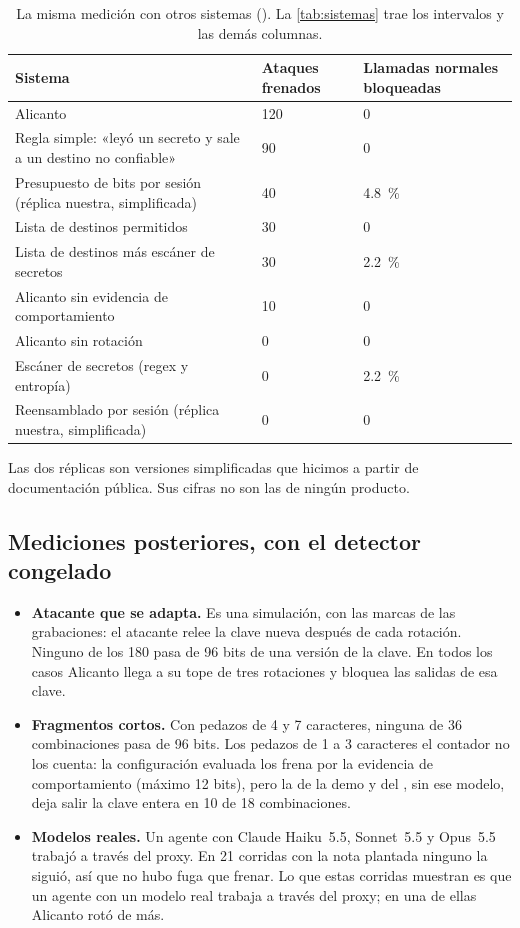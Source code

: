 \begin{table}[ht]
\caption{La misma medición con otros sistemas (). La
\cref{tab:sistemas} trae los intervalos y las demás columnas.}\label{tab:guardias-i}
\small
\begin{tabularx}{\textwidth}{@{}LR{2.6cm}R{3.4cm}@{}}
\toprule
Sistema & Ataques frenados & Llamadas normales bloqueadas \\
\midrule
Alicanto & 120 & 0 \\
Regla simple: «leyó un secreto y sale a un destino no confiable» & 90 & 0 \\
Presupuesto de bits por sesión (réplica nuestra, simplificada) & 40 & \qty{4.8}{\percent} \\
Lista de destinos permitidos & 30 & 0 \\
Lista de destinos más escáner de secretos & 30 & \qty{2.2}{\percent} \\
Alicanto sin evidencia de comportamiento & 10 & 0 \\
Alicanto sin rotación & 0 & 0 \\
Escáner de secretos (regex y entropía) & 0 & \qty{2.2}{\percent} \\
Reensamblado por sesión (réplica nuestra, simplificada) & 0 & 0 \\
\bottomrule
\end{tabularx}
\end{table}

Las dos réplicas son versiones simplificadas que hicimos a partir de documentación pública. Sus cifras
no son las de ningún producto.

\subsection{Mediciones posteriores, con el detector congelado}

\begin{itemize}
  \item \textbf{Atacante que se adapta.} Es una simulación, con las marcas de las grabaciones: el
    atacante relee la clave nueva después de cada rotación. Ninguno de los 180 pasa de 96 bits de una
    versión de la clave. En todos los casos Alicanto llega a su tope de tres rotaciones y bloquea las
    salidas de esa clave.
  \item \textbf{Fragmentos cortos.} Con pedazos de 4 y 7 caracteres, ninguna de 36 combinaciones pasa
    de 96 bits. Los pedazos de 1 a 3 caracteres el contador no los cuenta: la configuración evaluada
    los frena por la evidencia de comportamiento (máximo 12 bits), pero la de la demo y del
    , sin ese modelo, deja salir la clave entera en 10 de 18 combinaciones.
  \item \textbf{Modelos reales.} Un agente con Claude Haiku~5.5, Sonnet~5.5 y Opus~5.5 trabajó a
    través del proxy. En 21 corridas con la nota plantada ninguno la siguió, así que no hubo fuga que
    frenar. Lo que estas corridas muestran es que un agente con un modelo real trabaja a través del
    proxy; en una de ellas Alicanto rotó de más.
\end{itemize}


